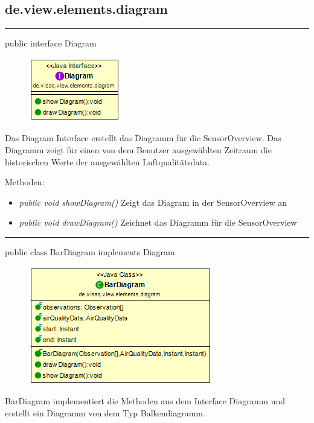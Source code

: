 
\subsection{de.view.elements.diagram}

\rule{\textwidth}{0.4pt} 
public interface Diagram

\begin{minipage}{0.3\textwidth}
    \begin{figure}[H]
        \includegraphics[scale = 0.7]{media/frontend/view/de.view.elements.diagram/Diagram_Class.png}
    \end{figure}
\end{minipage} \hfill
\begin{minipage}{0.6\textwidth}
Das Diagram Interface erstellt das Diagramm für die SensorOverview. Das Diagramm zeigt für einen von dem Benutzer ausgewählten Zeitraum die historischen Werte der ausgewählten Luftqualitätsdata.
\end{minipage}

Methoden:
\begin{itemize} 
    \item \emph{public void showDiagram()} Zeigt das Diagram in der SensorOverview an
    \item \emph{public void drawDiagram()} Zeichnet das Diagramm für die SensorOverview
\end{itemize}

\rule{\textwidth}{0.4pt} 
public class BarDiagram implements Diagram

\begin{minipage}{0.3\textwidth}
    \begin{figure}[H]
        \includegraphics[scale = 0.5]{media/frontend/view/de.view.elements.diagram/BarDiagram_Class.png}
    \end{figure}
    \end{minipage} \hfill
    \begin{minipage}{0.6\textwidth}
BarDiagram implementiert die Methoden aus dem Interface Diagramm und erstellt ein Diagramm von dem Typ Balkendiagramm.
\end{minipage}

